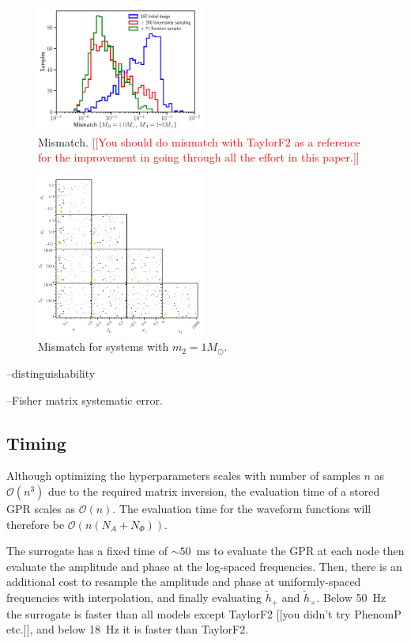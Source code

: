 \documentclass[prd,aps,letter,twocolumn,floatfix,notitlepage]{revtex4-1}
\newcommand{\red}[1]{\textcolor{red}{#1}}
\begin{document}
\begin{figure}[htb]
\centering
\includegraphics[width=0.49\textwidth]{mismatch.png}
\caption{Mismatch. \red{[[You should do mismatch with TaylorF2 as a reference for the improvement in 
going through all the effort in this paper.]]}
}
\label{fig:mismatch}
\end{figure}

\begin{figure}[htb]
\centering
\includegraphics[width=0.49\textwidth]{mismatchtrianglem10.png}
\caption{Mismatch for systems with $m_2=1M_\odot$.}
\label{fig:mismatchtriangle}
\end{figure}


--distinguishability

--Fisher matrix systematic error.



\subsection{Timing}

Although optimizing the hyperparameters scales with number of samples $n$ as $\mathcal{O}(n^3)$
due to the required matrix inversion, the evaluation time of a stored GPR scales as $\mathcal{O}(n)$.
The evaluation time for the waveform functions will therefore be $\mathcal{O}(n(N_A+N_\Phi))$.

The surrogate has a fixed time of $\sim 50$~ms to evaluate the GPR at each node then evaluate the amplitude
and phase at the log-spaced frequencies. Then, there is an additional cost to resample the amplitude and phase
at uniformly-spaced frequencies with interpolation, and finally evaluating $\tilde h_+$ and $\tilde h_\times$. 
Below 50~Hz the surrogate is faster than all models except TaylorF2 [[you didn't try PhenomP etc.]], and below
18~Hz it is faster than TaylorF2. 
\end{document}
